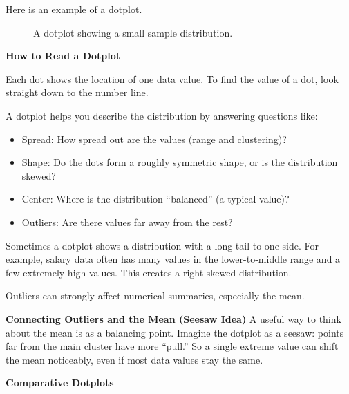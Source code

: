 Here is an example of a dotplot.
\begin{figure}[H]
    \centering
    \caption{A dotplot showing a small sample distribution.}
    \label{fig:dotplotExample}
\end{figure}

\textbf{How to Read a Dotplot}

Each dot shows the location of one data value. To find the value of a dot,
look straight down to the number line.

A dotplot helps you describe the distribution by answering questions like:
\begin{itemize}
    \item Spread: How spread out are the values (range and clustering)?
    \item Shape: Do the dots form a roughly symmetric shape, or is the distribution skewed?
    \item Center: Where is the distribution “balanced” (a typical value)?
    \item Outliers: Are there values far away from the rest?
\end{itemize}

Sometimes a dotplot shows a distribution with a long tail to one side.
For example, salary data often has many values in the lower-to-middle range
and a few extremely high values. This creates a right-skewed distribution.

Outliers can strongly affect numerical summaries, especially the mean.

\textbf{Connecting Outliers and the Mean (Seesaw Idea)}
A useful way to think about the mean is as a balancing point.
Imagine the dotplot as a seesaw: points far from the main cluster have more “pull.”
So a single extreme value can shift the mean noticeably, even if most data values stay the same.

\textbf{Comparative Dotplots}

